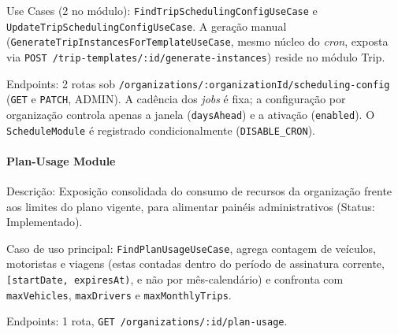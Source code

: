 Use Cases (2 no módulo): \texttt{FindTripSchedulingConfigUseCase} e \texttt{UpdateTripSchedulingConfigUseCase}. A geração manual (\texttt{GenerateTripInstancesForTemplateUseCase}, mesmo núcleo do \textit{cron}, exposta via \texttt{POST /trip-templates/:id/generate-instances}) reside no módulo Trip.

Endpoints: 2 rotas sob \texttt{/organizations/:organizationId/scheduling-config} (\texttt{GET} e \texttt{PATCH}, ADMIN). A cadência dos \textit{jobs} é fixa; a configuração por organização controla apenas a janela (\texttt{daysAhead}) e a ativação (\texttt{enabled}). O \texttt{ScheduleModule} é registrado condicionalmente (\texttt{DISABLE\_CRON}).

\paragraph{Plan-Usage Module}

Descrição: Exposição consolidada do consumo de recursos da organização frente aos limites do plano vigente, para alimentar painéis administrativos (Status: Implementado).

Caso de uso principal: \texttt{FindPlanUsageUseCase}, agrega contagem de veículos, motoristas e viagens (estas contadas dentro do período de assinatura corrente, \texttt{[startDate, expiresAt)}, e não por mês-calendário) e confronta com \texttt{maxVehicles}, \texttt{maxDrivers} e \texttt{maxMonthlyTrips}.

Endpoints: 1 rota, \texttt{GET /organizations/:id/plan-usage}.
